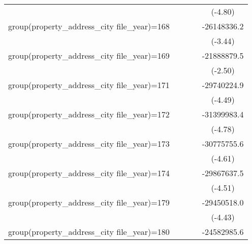 {\begin{tabular}{l*{4}{c}}
                    &                     &                     &                     &     (-4.80)         \\
\addlinespace
group(property\_address\_city file\_year)=168&                     &                     &                     & -26148336.2\sym{***}\\
                    &                     &                     &                     &     (-3.44)         \\
\addlinespace
group(property\_address\_city file\_year)=169&                     &                     &                     & -21888879.5\sym{*}  \\
                    &                     &                     &                     &     (-2.50)         \\
\addlinespace
group(property\_address\_city file\_year)=171&                     &                     &                     & -29740224.9\sym{***}\\
                    &                     &                     &                     &     (-4.49)         \\
\addlinespace
group(property\_address\_city file\_year)=172&                     &                     &                     & -31399983.4\sym{***}\\
                    &                     &                     &                     &     (-4.78)         \\
\addlinespace
group(property\_address\_city file\_year)=173&                     &                     &                     & -30775755.6\sym{***}\\
                    &                     &                     &                     &     (-4.61)         \\
\addlinespace
group(property\_address\_city file\_year)=174&                     &                     &                     & -29867637.5\sym{***}\\
                    &                     &                     &                     &     (-4.51)         \\
\addlinespace
group(property\_address\_city file\_year)=179&                     &                     &                     & -29450518.0\sym{***}\\
                    &                     &                     &                     &     (-4.43)         \\
\addlinespace
group(property\_address\_city file\_year)=180&                     &                     &                     & -24582985.6\sym{***}\\

\end{tabular}}
